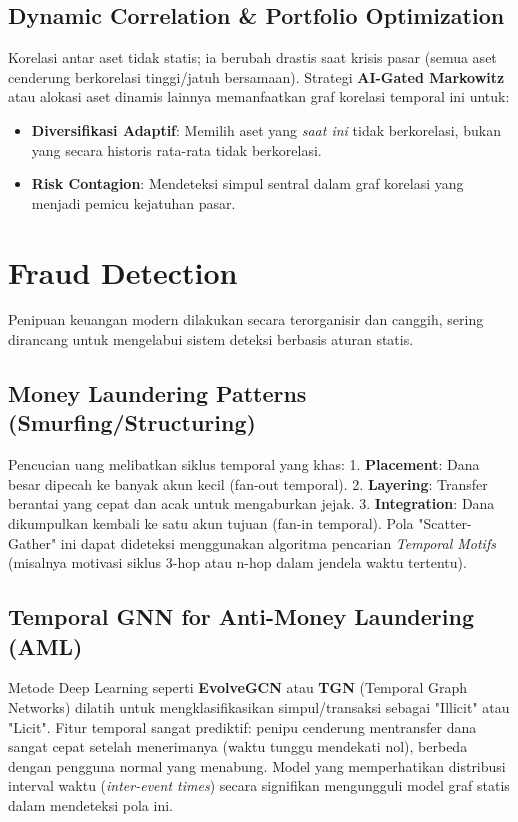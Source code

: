 \documentclass[12pt,a4paper]{book}
\begin{document}
\subsection{Dynamic Correlation & Portfolio Optimization}
Korelasi antar aset tidak statis; ia berubah drastis saat krisis pasar (semua aset cenderung berkorelasi tinggi/jatuh bersamaan). Strategi \textbf{AI-Gated Markowitz} atau alokasi aset dinamis lainnya memanfaatkan graf korelasi temporal ini untuk:
\begin{itemize}
    \item \textbf{Diversifikasi Adaptif}: Memilih aset yang \textit{saat ini} tidak berkorelasi, bukan yang secara historis rata-rata tidak berkorelasi.
    \item \textbf{Risk Contagion}: Mendeteksi simpul sentral dalam graf korelasi yang menjadi pemicu kejatuhan pasar.
\end{itemize}

\section{Fraud Detection}
Penipuan keuangan modern dilakukan secara terorganisir dan canggih, sering dirancang untuk mengelabui sistem deteksi berbasis aturan statis.

\subsection{Money Laundering Patterns (Smurfing/Structuring)}
Pencucian uang melibatkan siklus temporal yang khas:
1.  \textbf{Placement}: Dana besar dipecah ke banyak akun kecil (fan-out temporal).
2.  \textbf{Layering}: Transfer berantai yang cepat dan acak untuk mengaburkan jejak.
3.  \textbf{Integration}: Dana dikumpulkan kembali ke satu akun tujuan (fan-in temporal).
Pola "Scatter-Gather" ini dapat dideteksi menggunakan algoritma pencarian \textit{Temporal Motifs} (misalnya motivasi siklus 3-hop atau n-hop dalam jendela waktu tertentu).

\subsection{Temporal GNN for Anti-Money Laundering (AML)}
Metode Deep Learning seperti \textbf{EvolveGCN} atau \textbf{TGN} (Temporal Graph Networks) dilatih untuk mengklasifikasikan simpul/transaksi sebagai "Illicit" atau "Licit".
Fitur temporal sangat prediktif: penipu cenderung mentransfer dana sangat cepat setelah menerimanya (waktu tunggu mendekati nol), berbeda dengan pengguna normal yang menabung. Model yang memperhatikan distribusi interval waktu (\textit{inter-event times}) secara signifikan mengungguli model graf statis dalam mendeteksi pola ini.
\end{document}
